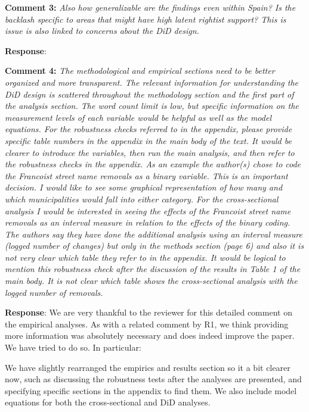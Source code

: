 \documentclass[12pt, a4paper, notitlepage]{article}
\begin{document}
\textbf{Comment 3:} \textit{Also how generalizable are the findings even within Spain? Is the backlash specific to areas that might have high latent rightist support? This is issue is also linked to concerns about the DiD design.}

\textbf{Response}: {}

\textbf{Comment 4:} \textit{The methodological and empirical sections need to be better organized and more transparent. The relevant information for understanding the DiD design is scattered throughout the methodology section and the first part of the analysis section. The word count limit is low, but specific information on the measurement levels of each variable would be helpful as well as the model equations. For the robustness checks referred to in the appendix, please provide specific table numbers in the appendix in the main body of the text. It would be clearer to introduce the variables, then run the main analysis, and then refer to the robustness checks in the appendix. As an example the author(s) chose to code the Francoist street name removals as a binary variable. This is an important decision. I would like to see some graphical representation of how many and which municipalities would fall into either category. For the cross-sectional analysis I would be interested in seeing the effects of the Francoist street name removals as an interval measure in relation to the effects of the binary coding. The authors say they have done the additional analysis using an interval measure (logged number of changes) but only in the methods section (page 6) and also it is not very clear which table they refer to in the appendix. It would be logical to mention this robustness check after the discussion of the results in Table 1 of the main body. It is not clear which table shows the cross-sectional analysis with the logged number of removals.}

\textbf{Response}: We are very thankful to the reviewer for this detailed comment on the empirical analyses.
As with a related comment by R1, we think providing more information was absolutely necessary and does indeed improve the paper. We have tried to do so. In particular:

We have slightly rearranged the empirics and results section so it a bit clearer now, such as discussing the robustness tests after the analyses are presented, and specifying specific sections in the appendix to find them. We also include model equations for both the cross-sectional and DiD analyses.
\end{document}
